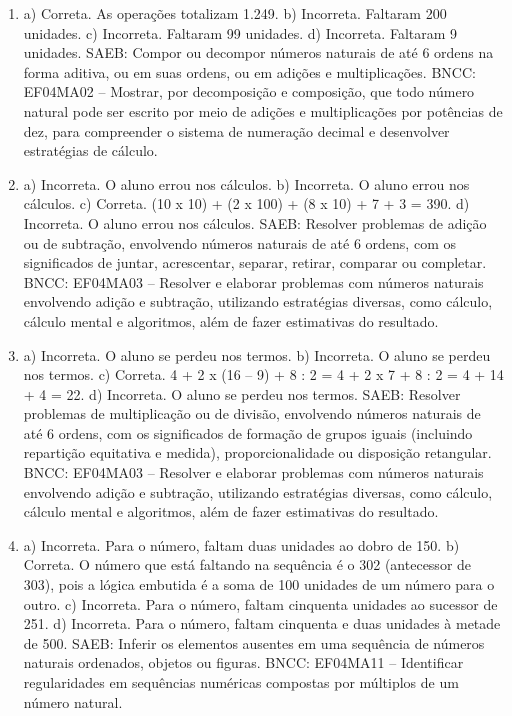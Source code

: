\begin{enumerate}
\item
a) Correta. As operações totalizam 1.249.
b) Incorreta. Faltaram 200 unidades.
c) Incorreta. Faltaram 99 unidades.
d) Incorreta. Faltaram 9 unidades.
SAEB: Compor ou decompor números naturais de até 6 ordens na
forma aditiva, ou em suas ordens, ou em adições e multiplicações.
BNCC: EF04MA02 -- Mostrar, por decomposição e composição, que todo número natural pode ser escrito
por meio de adições e multiplicações por potências de dez, para compreender o sistema de
numeração decimal e desenvolver estratégias de cálculo.

\item
a) Incorreta. O aluno errou nos cálculos.
b) Incorreta. O aluno errou nos cálculos.
c) Correta. (10 x 10) + (2 x 100) + (8 x 10) + 7 + 3 = 390.
d) Incorreta. O aluno errou nos cálculos.
SAEB: Resolver problemas de adição ou de subtração,
envolvendo números naturais de até 6 ordens, com os significados de
juntar, acrescentar, separar, retirar, comparar ou completar.
BNCC: EF04MA03 -- Resolver e elaborar problemas com números naturais envolvendo adição e subtração,
utilizando estratégias diversas, como cálculo, cálculo mental e algoritmos, além de fazer estimativas
do resultado.

\item
a) Incorreta. O aluno se perdeu nos termos.
b) Incorreta. O aluno se perdeu nos termos.
c) Correta. 4 + 2 x (16 -- 9) + 8 : 2 = 4 + 2 x 7 + 8 : 2 = 4 + 14 + 4 = 22.
d) Incorreta. O aluno se perdeu nos termos.
SAEB: Resolver problemas de multiplicação ou de divisão, envolvendo números
naturais de até 6 ordens, com os significados de formação de grupos
iguais (incluindo repartição equitativa e medida), proporcionalidade ou
disposição retangular.
BNCC: EF04MA03 -- Resolver e elaborar problemas com números naturais envolvendo adição e subtração,
utilizando estratégias diversas, como cálculo, cálculo mental e algoritmos, além de fazer estimativas
do resultado.

\item
a) Incorreta. Para o número, faltam duas unidades ao dobro de 150.
b) Correta. O número que está faltando na sequência é o 302 (antecessor de 303),
pois a lógica embutida é a soma de 100 unidades de um número para o
outro.
c) Incorreta. Para o número, faltam cinquenta unidades ao sucessor de 251.
d) Incorreta. Para o número, faltam cinquenta e duas unidades à metade de 500.
SAEB: Inferir os elementos ausentes em uma sequência de
números naturais ordenados, objetos ou figuras.
BNCC: EF04MA11 -- Identificar regularidades em sequências numéricas compostas por múltiplos de um
número natural.


\end{enumerate}
